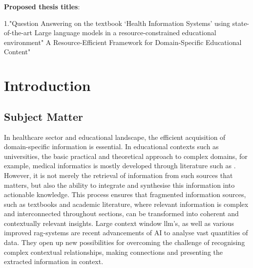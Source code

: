 \textbf{Proposed thesis titles}:

1."Question Answering on the textbook ‘Health Information Systems’ using state-of-the-art Large language models in a resource-constrained educational environment"
%
A Resource-Efficient Framework for Domain-Specific Educational Content"
\chapter{Introduction}\label{ch:introduction}
\section{Subject Matter}\label{sec:subject matter}
In healthcare sector and educational landscape, the efficient acquisition of domain-specific information is essential. 
In educational contexts such as universities, the basic practical and theoretical approach to complex domains, for example, medical informatics is mostly developed through literature such as \citet{bb2}.
However, it is not merely the retrieval of information from such sources that matters, but also the ability to integrate and synthesise this information into actionable knowledge.
This process ensures that fragmented information sources, such as textbooks and academic literature, where relevant information is complex and interconnected throughout sections, can be transformed into coherent and contextually relevant insights.
%
Large context window \ac{llm}'s, as well as various improved \ac{rag}-systems are recent advancements of AI to analyse vast quantities of data.
They open up new possibilities for overcoming the challenge of recognising complex contextual relationships, making connections and presenting the extracted information in context.
%
